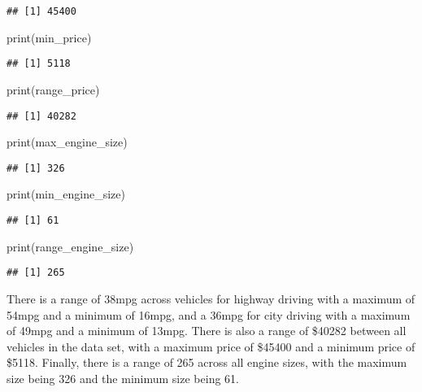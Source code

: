 \documentclass[
]{article}
\newenvironment{Shaded}{\begin{snugshade}}{\end{snugshade}}
\newcommand{\FunctionTok}[1]{\textcolor[rgb]{0.00,0.00,0.00}{#1}}
\newcommand{\NormalTok}[1]{#1}
\begin{document}
\begin{verbatim}
## [1] 45400
\end{verbatim}

\begin{Shaded}
\begin{Highlighting}[]
\FunctionTok{print}\NormalTok{(min\_price)}
\end{Highlighting}
\end{Shaded}

\begin{verbatim}
## [1] 5118
\end{verbatim}

\begin{Shaded}
\begin{Highlighting}[]
\FunctionTok{print}\NormalTok{(range\_price)}
\end{Highlighting}
\end{Shaded}

\begin{verbatim}
## [1] 40282
\end{verbatim}

\begin{Shaded}
\begin{Highlighting}[]
\FunctionTok{print}\NormalTok{(max\_engine\_size)}
\end{Highlighting}
\end{Shaded}

\begin{verbatim}
## [1] 326
\end{verbatim}

\begin{Shaded}
\begin{Highlighting}[]
\FunctionTok{print}\NormalTok{(min\_engine\_size)}
\end{Highlighting}
\end{Shaded}

\begin{verbatim}
## [1] 61
\end{verbatim}

\begin{Shaded}
\begin{Highlighting}[]
\FunctionTok{print}\NormalTok{(range\_engine\_size)}
\end{Highlighting}
\end{Shaded}

\begin{verbatim}
## [1] 265
\end{verbatim}

There is a range of 38mpg across vehicles for highway driving with a
maximum of 54mpg and a minimum of 16mpg, and a 36mpg for city driving
with a maximum of 49mpg and a minimum of 13mpg. There is also a range of
\$40282 between all vehicles in the data set, with a maximum price of
\$45400 and a minimum price of \$5118. Finally, there is a range of 265
across all engine sizes, with the maximum size being 326 and the minimum
size being 61.\n
\end{document}

